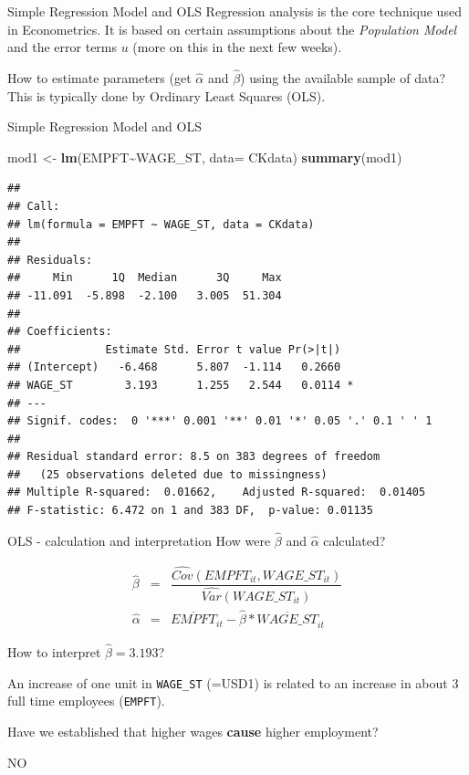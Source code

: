 \documentclass[
  ignorenonframetext,
]{beamer}
\newenvironment{Shaded}{\begin{snugshade}}{\end{snugshade}}
\newcommand{\AttributeTok}[1]{\textcolor[rgb]{0.13,0.29,0.53}{#1}}
\newcommand{\FunctionTok}[1]{\textcolor[rgb]{0.13,0.29,0.53}{\textbf{#1}}}
\newcommand{\NormalTok}[1]{#1}
\newcommand{\OtherTok}[1]{\textcolor[rgb]{0.56,0.35,0.01}{#1}}
\newcommand{\SpecialCharTok}[1]{\textcolor[rgb]{0.81,0.36,0.00}{\textbf{#1}}}
\begin{document}
\begin{frame}{Simple Regression Model and OLS}
\label{simple-regression-model-and-ols}
Regression analysis is the core technique used in Econometrics. It is
based on certain assumptions about the \emph{Population Model} and the
error terms \(u\) (more on this in the next few weeks).

How to estimate parameters (get \(\widehat{\alpha}\) and
\(\widehat{\beta}\)) using the available sample of data? This is
typically done by Ordinary Least Squares (OLS).
\end{frame}

\begin{frame}[fragile]{Simple Regression Model and OLS}
\label{simple-regression-model-and-ols-1}
\footnotesize

\begin{Shaded}
\begin{Highlighting}[]
\NormalTok{mod1 }\OtherTok{\textless{}{-}} \FunctionTok{lm}\NormalTok{(EMPFT}\SpecialCharTok{\textasciitilde{}}\NormalTok{WAGE\_ST, }\AttributeTok{data=}\NormalTok{ CKdata)}
\FunctionTok{summary}\NormalTok{(mod1)}
\end{Highlighting}
\end{Shaded}

\begin{verbatim}
## 
## Call:
## lm(formula = EMPFT ~ WAGE_ST, data = CKdata)
## 
## Residuals:
##     Min      1Q  Median      3Q     Max 
## -11.091  -5.898  -2.100   3.005  51.304 
## 
## Coefficients:
##             Estimate Std. Error t value Pr(>|t|)  
## (Intercept)   -6.468      5.807  -1.114   0.2660  
## WAGE_ST        3.193      1.255   2.544   0.0114 *
## ---
## Signif. codes:  0 '***' 0.001 '**' 0.01 '*' 0.05 '.' 0.1 ' ' 1
## 
## Residual standard error: 8.5 on 383 degrees of freedom
##   (25 observations deleted due to missingness)
## Multiple R-squared:  0.01662,    Adjusted R-squared:  0.01405 
## F-statistic: 6.472 on 1 and 383 DF,  p-value: 0.01135
\end{verbatim}

\normalsize
\end{frame}

\begin{frame}{OLS - calculation and interpretation}
\label{ols---calculation-and-interpretation}
How were \(\widehat{\beta}\) and \(\widehat{\alpha}\) calculated?

\begin{eqnarray*}
  \widehat{\beta}&=&\dfrac{\widehat{Cov}(EMPFT_{it},WAGE\_ST_{it})}{\widehat{Var}(WAGE\_ST_{it})}\\
  \widehat{\alpha}&=&\overline{EMPFT}_{it}-\widehat{\beta}*\overline{WAGE\_ST}_{it}
\end{eqnarray*}

How to interpret \(\widehat{\beta}=3.193\)?

\textcolor{student}{An increase of one unit in \texttt{WAGE\_ST} (=USD1) is related to an increase in about 3 full time employees (\texttt{EMPFT}).}

Have we established that higher wages \textbf{cause} higher employment?

\textcolor{student}{NO}
\end{frame}
\end{document}
